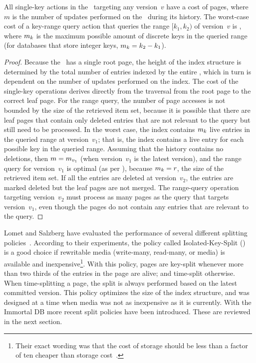 \thmskip
\begin{theorem}
All single-key actions in the \TSBtree\ targeting any version~$v$ have a cost
of  pages, where $m$ is the number of updates performed
on the \TSBtree\ during its history. 
The worst-case cost of a key-range query action that queries the range $[k_1,
k_2)$ of version~$v$ is ,
where $m_{k}$ is the maximum possible amount of discrete keys in the
queried range (for databases that store integer keys, $m_{k} = k_2 -
k_1$).
\end{theorem}
\begin{proof}
Because the \TSBtree\ has a single root page, the height of the index
structure is determined by the total number of entries indexed by the entire
\TSBtree, which in turn is dependent on the number of updates performed on
the index.
The cost of the single-key operations derives directly from the traversal
from the root page to the correct leaf page.
For the range query, the number of page accesses is not bounded by the size
of the retrieved item set, because it is possible that there are leaf pages
that contain only deleted entries that are not relevant to the query but still
need to be processed. 
In the worst case, the index contains $m_{k}$ live entries in the
queried range at version~$v_1$; that is, the index contains a live entry for
each possible key in the queried range. 
Assuming that the history contains no deletions, then $m =
m_{v_1}$ (when version~$v_1$ is the latest version), and the range
query for version~$v_1$ is optimal (as per ), because
$m_{k} = r$, the size of the retrieved item set.
If all the entries are deleted at version~$v_2$, the entries are marked
deleted but the leaf pages are not merged.
The range-query operation targeting version~$v_2$ must process as many pages
as the query that targets version~$v_1$, even though the pages do not
contain any entries that are relevant to the query.
\end{proof}
\thmskip

Lomet and Salzberg have evaluated the performance of several different
splitting policies~\cite{lomet:1990:tsb-performance}. 
According to their experiments, the policy called Isolated-Key-Split
()\label{def:iks} is a good choice if rewritable
media (write-many, read-many, or 
media\label{def:wmrm}) is available and
inexpensive\footnote{Their exact wording was that the cost of
 storage should be less than a factor of ten cheaper than 
 storage cost~\cite{lomet:1990:tsb-performance}.}.
With this policy, pages are key-split whenever more than two thirds of the
entries in the page are alive; and time-split otherwise.
When time-splitting a page, the split is always performed based on the
latest committed version.
This policy optimizes the size of the index structure, and was designed at
a time when  media was not as inexpensive as it is currently.
With the Immortal DB more recent split policies have been introduced. 
These are reviewed in the next section.   

